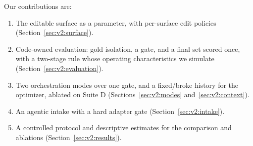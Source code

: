 Our contributions are:
\begin{enumerate}[leftmargin=*,nosep]
\item The editable surface as a parameter, with per-surface edit policies (Section~\ref{sec:v2:surface}).
\item Code-owned evaluation: gold isolation, a gate, and a final set scored once, with a two-stage rule whose operating characteristics we simulate (Section~\ref{sec:v2:evaluation}).
\item Two orchestration modes over one gate, and a fixed/broke history for the optimizer, ablated on Suite D (Sections~\ref{sec:v2:modes} and~\ref{sec:v2:context}).
\item An agentic intake with a hard adapter gate (Section~\ref{sec:v2:intake}).
\item A controlled protocol and descriptive estimates for the comparison and ablations (Section~\ref{sec:v2:results}). 
\end{enumerate}
